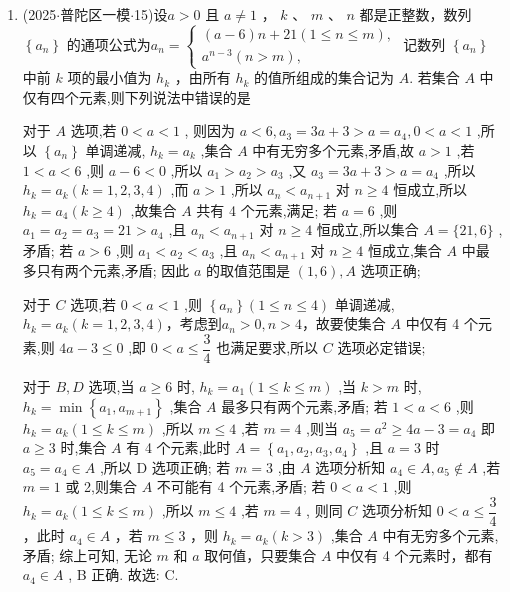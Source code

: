 \begin{enumerate}
    \item (2025$\cdot$普陀区一模$\cdot$15)设$a>0$ 且 $a \neq  1$ ， $k$ 、 $m$ 、 $n$ 都是正整数，数列 $\left\{  {a}_{n}\right\}$ 的通项公式为$a_n = \left\{  \begin{array}{l} \left( {a - 6}\right) n + {21}\left( {1 \leq  n \leq  m}\right) , \\  {a}^{n - 3}\left( {n > m}\right) , \end{array}\right.$ 记数列 $\left\{  {a}_{n}\right\}$ 中前 $k$ 项的最小值为 ${h}_{k}$ ，由所有 ${h}_{k}$ 的值所组成的集合记为 $A$. 若集合 $A$ 中仅有四个元素,则下列说法中错误的是 
    \begin{jieda}
        对于 ${A}$ 选项,若 $0 < a < 1$ , 则因为 $a < 6,{a}_{3} = {3a} +  3 > a = {a}_{4},0 < a < 1$ ,所以 $\left\{  {a}_{n}\right\}$ 单调递减, ${h}_{k} = {a}_{k}$ ,集合 $A$ 中有无穷多个元素,矛盾,故 $a > 1$ ,若 $1 < a < 6$ ,则 $a - 6 < 0$ ,所以 ${a}_{1} > {a}_{2} > {a}_{3}$ ,又 ${a}_{3} = {3a} + 3 > a = {a}_{4}$ ,所以 ${h}_{k} = {a}_{k}(k = 1,2,3,4)$ ,而 $a > 1$ ,所以 ${a}_{n} < {a}_{n + 1}$ 对 $n \geq  4$ 恒成立,所以 ${h}_{k} =  {a}_{4}\left( {k \geq  4}\right)$ ,故集合 $A$ 共有 4 个元素,满足; 若 $a = 6$ ,则 ${a}_{1} =  {a}_{2} = {a}_{3} = {21} > {a}_{4}$ ,且 ${a}_{n} < {a}_{n + 1}$ 对 $n \geq  4$ 恒成立,所以集合 $A = \{ {21},6\}$ ,矛盾; 若 $a > 6$ ,则 ${a}_{1} < {a}_{2} < {a}_{3}$ ,且 ${a}_{n} < {a}_{n + 1}$ 对 $n \geq  4$ 恒成立,集合 $A$ 中最多只有两个元素,矛盾; 因此 $a$ 的取值范围是 $\left( {1,6}\right) ,{A}$ 选项正确; 
        
        对于 ${C}$ 选项,若 $0 < a < 1$ ,则 $\left\{  {a}_{n}\right\}  \left( {1 \leq  n \leq  4}\right)$ 单调递减, ${h}_{k} = {a}_{k}\left( {k = 1,2,3,4}\right)$，考虑到$a_n > 0, n > 4$，故要使集合 $A$ 中仅有 4 个元素,则 ${4a} - 3 \leq  0$ ,即 $0 < a \leq  \dfrac{3}{4}$ 也满足要求,所以 ${C}$ 选项必定错误; 
        
        对于 ${B},{D}$ 选项,当 $a \geq  6$ 时, ${h}_{k} = {a}_{1}(1 \leq  k \leq  m)$ ,当 $k > m$ 时, ${h}_{k} = \min \left\{  {{a}_{1},{a}_{m + 1}}\right\}$ ,集合 $A$ 最多只有两个元素,矛盾; 若 $1 < a < 6$ ,则 ${h}_{k} = {a}_{k}\left( {1 \leq  k \leq  m}\right)$ ,所以 $m \leq  4$ ,若 $m = 4$ ,则当 ${a}_{5} = {a}^{2} \geq  {4a} - 3 = {a}_{4}$ 即 $a \geq  3$ 时,集合 $A$ 有 4 个元素,此时 $A = \left\{  {{a}_{1},{a}_{2},{a}_{3},{a}_{4}}\right\}$ ,且 $a = 3$ 时 ${a}_{5} =  {a}_{4} \in  A$ ,所以 D 选项正确; 若 $m = 3$ ,由 ${A}$ 选项分析知 ${a}_{4} \in  A,{a}_{5} \notin  A$ ,若 $m = 1$ 或 2,则集合 $A$ 不可能有 4 个元素,矛盾; 若 $0 < a < 1$ ,则 ${h}_{k} = {a}_{k}\left( {1 \leq  k \leq  m}\right)$ ,所以 $m \leq  4$ ,若 $m = 4$ , 则同 ${C}$ 选项分析知 $0 < a \leq  \dfrac{3}{4}$ ，此时 ${a}_{4} \in  A$ ，若 $m \leq  3$ ，则 ${h}_{k} = {a}_{k}\left( {k > 3}\right)$ ,集合 $A$ 中有无穷多个元素,矛盾; 综上可知, 无论 $m$ 和 $a$ 取何值，只要集合 $A$ 中仅有 4 个元素时，都有 ${a}_{4} \in  A$ , B 正确. 故选: C.
    \end{jieda}
\end{enumerate}
